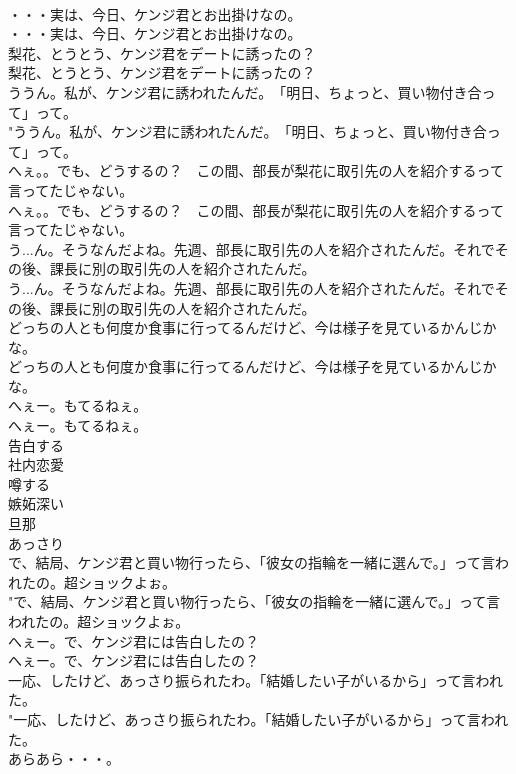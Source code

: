 \documentclass[8pt]{extreport}
\begin{document}
\begin{CJK}{UTF8}{min}
\\	・・・実は、今日、ケンジ君とお出掛けなの。	
\\	・・・実は、今日、ケンジ君とお出掛けなの。 
\\	梨花、とうとう、ケンジ君をデートに誘ったの？	
\\	梨花、とうとう、ケンジ君をデートに誘ったの？ 
\\	ううん。私が、ケンジ君に誘われたんだ。　「明日、ちょっと、買い物付き合って」って。	
\\	"ううん。私が、ケンジ君に誘われたんだ。　「明日、ちょっと、買い物付き合って」って。 
\\	へぇ。。でも、どうするの？　この間、部長が梨花に取引先の人を紹介するって言ってたじゃない。	
\\	へぇ。。でも、どうするの？　この間、部長が梨花に取引先の人を紹介するって言ってたじゃない。 
\\	う...ん。そうなんだよね。先週、部長に取引先の人を紹介されたんだ。それでその後、課長に別の取引先の人を紹介されたんだ。	
\\	う...ん。そうなんだよね。先週、部長に取引先の人を紹介されたんだ。それでその後、課長に別の取引先の人を紹介されたんだ。 
\\	どっちの人とも何度か食事に行ってるんだけど、今は様子を見ているかんじかな。	
\\	どっちの人とも何度か食事に行ってるんだけど、今は様子を見ているかんじかな。 
\\	へぇー。もてるねぇ。	
\\	へぇー。もてるねぇ。 
\\	告白する
\\	社内恋愛
\\	噂する
\\	嫉妬深い
\\	旦那
\\	あっさり
\\	で、結局、ケンジ君と買い物行ったら、「彼女の指輪を一緒に選んで。」って言われたの。超ショックよぉ。	
\\	"で、結局、ケンジ君と買い物行ったら、「彼女の指輪を一緒に選んで。」って言われたの。超ショックよぉ。 
\\	へぇー。で、ケンジ君には告白したの？	
\\	へぇー。で、ケンジ君には告白したの？ 
\\	一応、したけど、あっさり振られたわ。「結婚したい子がいるから」って言われた。	
\\	"一応、したけど、あっさり振られたわ。「結婚したい子がいるから」って言われた。 
\\	あらあら・・・。	

\end{CJK}
\end{document}
